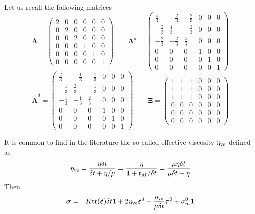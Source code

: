 Let us recall the following matrices
\[
{\bm \Lambda}=
\left(
\begin{array}{cccccc}
2 & 0 & 0 & 0 & 0 & 0 \\
0 & 2 & 0 & 0 & 0 & 0 \\
0 & 0 & 2 & 0 & 0 & 0 \\
0 & 0 & 0 & 1 & 0 & 0 \\
0 & 0 & 0 & 0 & 1 & 0 \\
0 & 0 & 0 & 0 & 0 & 1 
\end{array}
\right)
\qquad
{\bm \Lambda}^d
=
\left(
\begin{array}{cccccc}
\frac43 & - \frac23 & - \frac23 & 0 & 0 & 0 \\
-\frac23 & \frac43 & - \frac23  & 0 & 0 & 0\\
-\frac23& - \frac23 & \frac43  & 0 & 0 & 0\\
0&0&0& 1&0 &0  \\
0&0&0&0&1 &0\\
0&0&0&0&0& 1
\end{array}
\right)
\]
\[
\tilde{\bm \Lambda}^d
=
\left(
\begin{array}{cccccc}
\frac23 & - \frac13 & - \frac13 & 0 & 0 & 0 \\
-\frac13 & \frac23 & - \frac13  & 0 & 0 & 0\\
-\frac13& - \frac13 & \frac23  & 0 & 0 & 0\\
0&0&0& 1&0 &0  \\
0&0&0&0&1 &0\\
0&0&0&0&0& 1
\end{array}
\right)
\qquad
{\bm \Xi}=
\left(
\begin{array}{cccccc}
1 & 1 & 1 & 0 & 0 & 0\\ 
1 & 1 & 1 & 0 & 0 & 0\\ 
1 & 1 & 1 & 0 & 0 & 0\\ 
0 & 0 & 0 & 0 & 0 & 0 \\
0 & 0 & 0 & 0 & 0 & 0 \\
0 & 0 & 0 & 0 & 0 & 0 
\end{array}
\right)
\]

It is common to find in the literature the so-called effective 
viscosity $\eta_{\rm ve}$ defined as 
\[
\eta_{\rm ve}
=\frac{\eta \delta t}{\delta t + \eta/\mu}
=\frac{\eta}{1 + t_M/\delta t}
=\frac{\mu\eta \delta t}{\mu \delta t + \eta}
\]
Then 
\begin{eqnarray}
\bm \sigma 
&=& 
K {\rm tr}(\dot{\bm\varepsilon}) \delta t {\bm 1}  +
2\eta_{\rm ve} \dot{\bm\varepsilon}^d +
\frac{ \eta_{\rm ve}}{\mu\delta t}  \bm\tau^0 + \sigma_m^0 {\bm 1}
\end{eqnarray}



